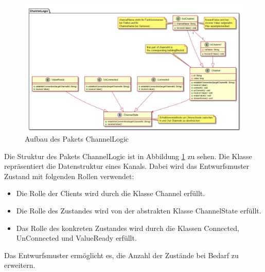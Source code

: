 \documentclass[parskip=full]{scrartcl}
\begin{document}
\begin{figure}[htbp]
	\begin{center}
		\includegraphics[width = 16cm]{Grafiken/ChannelLogic.PNG}
		\caption{Aufbau des Pakets ChannelLogic}
		\label{ChannelLogic}
	\end{center}
\end{figure}

Die Struktur des Pakets ChannelLogic ist in Abbildung \ref{ChannelLogic} zu sehen. Die Klasse repräsentiert die Datenstruktur eines Kanals. Dabei wird das Entwurfsmuster Zustand mit folgenden Rollen verwendet:
\begin{itemize}

\item Die Rolle der Clients wird durch die Klasse Channel erfüllt.
\item Die Rolle des Zustandes wird von der abstrakten Klasse ChannelState erfüllt.
\item Das Rolle des konkreten Zustandes wird durch die Klassen Connected, UnConnected und ValueReady erfüllt.

\end{itemize}

Das Entwurfsmuster ermöglicht es, die Anzahl der Zustände bei Bedarf zu erweitern.
\end{document}
